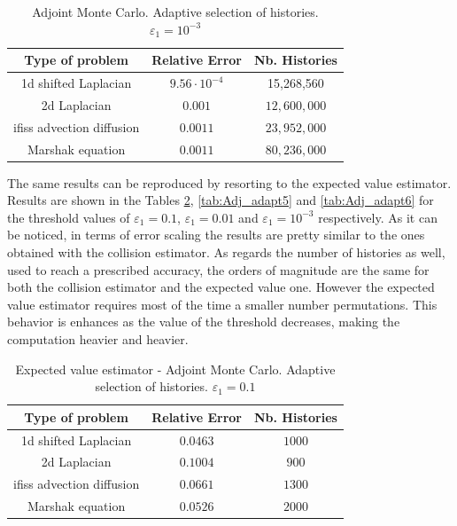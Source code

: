 \documentclass[a4paper,10pt]{article}
\begin{document}
\begin{table}[!h]
\centering
\begin{tabular}{|c|c|c|}
\hline
\textbf{Type of problem} & \textbf{Relative Error} &\textbf{Nb. Histories}\\
\hline
1d shifted Laplacian & $9.56 \cdot 10^{-4}$ & 15,268,560 \\
\hline 
2d Laplacian & $0.001$ & $12,600,000$\\
\hline
ifiss advection diffusion & $0.0011$  & $23,952,000$\\
\hline
Marshak equation & $0.0011$ &  $80,236,000$\\
\hline
\end{tabular}
\caption{Adjoint Monte Carlo. Adaptive selection of histories. 
$\varepsilon_1=10^{-3}$} 
\label{tab:Adj_adapt3}
\end{table}

The same results can be reproduced by resorting to the expected value 
estimator. Results are shown in the Tables \ref{tab:Adj_adapt4}, 
\ref{tab:Adj_adapt5} and \ref{tab:Adj_adapt6} for the threshold values of 
$\varepsilon_1=0.1$, $\varepsilon_1=0.01$ and $\varepsilon_1=10^{-3}$ 
respectively. As it can be noticed, in terms of error scaling the results are 
pretty similar to the ones obtained with the collision estimator. As regards 
the number of histories as well, used to reach a prescribed accuracy, the 
orders of magnitude are the same for both the collision estimator and the 
expected value one. However the expected value estimator requires most of the 
time a smaller number permutations. This behavior is enhances as the value of 
the threshold decreases, making the computation heavier and heavier. 


\begin{table}[!h]
\centering
\begin{tabular}{|c|c|c|}
\hline
\textbf{Type of problem} & \textbf{Relative Error} &\textbf{Nb. Histories}\\
\hline
1d shifted Laplacian & $0.0463$ & $1000$\\
\hline 
2d Laplacian & $0.1004$ & $900$\\
\hline
ifiss advection diffusion & $0.0661$  & $1300$\\
\hline
Marshak equation & $0.0526$ & $2000$\\
\hline
\end{tabular}
\caption{Expected value estimator - Adjoint Monte Carlo. Adaptive selection of 
histories. 
$\varepsilon_1=0.1$} 
\label{tab:Adj_adapt4}
\end{table}
\end{document}
